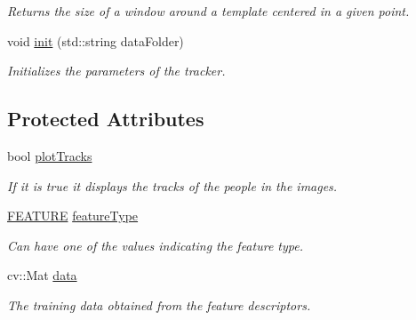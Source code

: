 \begin{DoxyCompactItemize}
\begin{DoxyCompactList}\small\item\em Returns the size of a window around a template centered in a given point. \item\end{DoxyCompactList}\item 
\hypertarget{classfeatureDetector_a9f5be7a342e76712eb77368c3e2bedfe}{
void \hyperlink{classfeatureDetector_a9f5be7a342e76712eb77368c3e2bedfe}{init} (std::string dataFolder)}
\label{classfeatureDetector_a9f5be7a342e76712eb77368c3e2bedfe}

\begin{DoxyCompactList}\small\item\em Initializes the parameters of the tracker. \item\end{DoxyCompactList}\end{DoxyCompactItemize}
\subsection*{Protected Attributes}
\begin{DoxyCompactItemize}
\item 
\hypertarget{classfeatureDetector_acc6844523e2ad34b294324dd4a02820e}{
bool \hyperlink{classfeatureDetector_acc6844523e2ad34b294324dd4a02820e}{plotTracks}}
\label{classfeatureDetector_acc6844523e2ad34b294324dd4a02820e}

\begin{DoxyCompactList}\small\item\em If it is true it displays the tracks of the people in the images. \item\end{DoxyCompactList}\item 
\hypertarget{classfeatureDetector_a22aa8f3d60aa9612c86837cb2198554b}{
\hyperlink{classfeatureDetector_a84a8847c4124b284d1d5ae20bc9be583}{FEATURE} \hyperlink{classfeatureDetector_a22aa8f3d60aa9612c86837cb2198554b}{featureType}}
\label{classfeatureDetector_a22aa8f3d60aa9612c86837cb2198554b}

\begin{DoxyCompactList}\small\item\em Can have one of the values indicating the feature type. \item\end{DoxyCompactList}\item 
\hypertarget{classfeatureDetector_a511ae0b1c13f95e5f08f1a0dd3da3d93}{
cv::Mat \hyperlink{classfeatureDetector_a511ae0b1c13f95e5f08f1a0dd3da3d93}{data}}
\label{classfeatureDetector_a511ae0b1c13f95e5f08f1a0dd3da3d93}

\begin{DoxyCompactList}\small\item\em The training data obtained from the feature descriptors. \item\end{DoxyCompactList}\end{DoxyCompactItemize}


